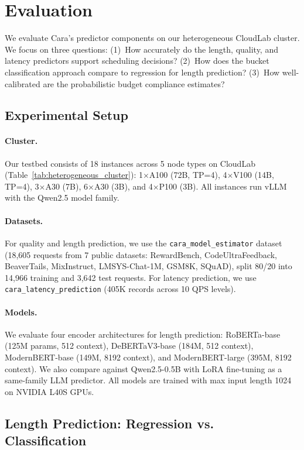 \documentclass[letterpaper, anonymous, twocolumn, 10pt]{article}
\begin{document}
\section{Evaluation} \label{section:evaluation}

We evaluate Cara's predictor components on our heterogeneous CloudLab cluster. We focus on three questions:
(1)~How accurately do the length, quality, and latency predictors support scheduling decisions?
(2)~How does the bucket classification approach compare to regression for length prediction?
(3)~How well-calibrated are the probabilistic budget compliance estimates?

\subsection{Experimental Setup}

\paragraph{Cluster.}
Our testbed consists of 18 instances across 5 node types on CloudLab (Table~\ref{tab:heterogeneous_cluster}): 1$\times$A100 (72B, TP=4), 4$\times$V100 (14B, TP=4), 3$\times$A30 (7B), 6$\times$A30 (3B), and 4$\times$P100 (3B). All instances run vLLM with the Qwen2.5 model family.

\paragraph{Datasets.}
For quality and length prediction, we use the \texttt{cara\_model\_estimator} dataset (18,605 requests from 7 public datasets: RewardBench, CodeUltraFeedback, BeaverTails, MixInstruct, LMSYS-Chat-1M, GSM8K, SQuAD), split 80/20 into 14,966 training and 3,642 test requests.
For latency prediction, we use \texttt{cara\_latency\_prediction} (405K records across 10 QPS levels).

\paragraph{Models.}
We evaluate four encoder architectures for length prediction: RoBERTa-base (125M params, 512 context), DeBERTaV3-base (184M, 512 context), ModernBERT-base (149M, 8192 context), and ModernBERT-large (395M, 8192 context).
We also compare against Qwen2.5-0.5B with LoRA fine-tuning as a same-family LLM predictor.
All models are trained with max input length 1024 on NVIDIA L40S GPUs.

\subsection{Length Prediction: Regression vs. Classification}
\end{document}
